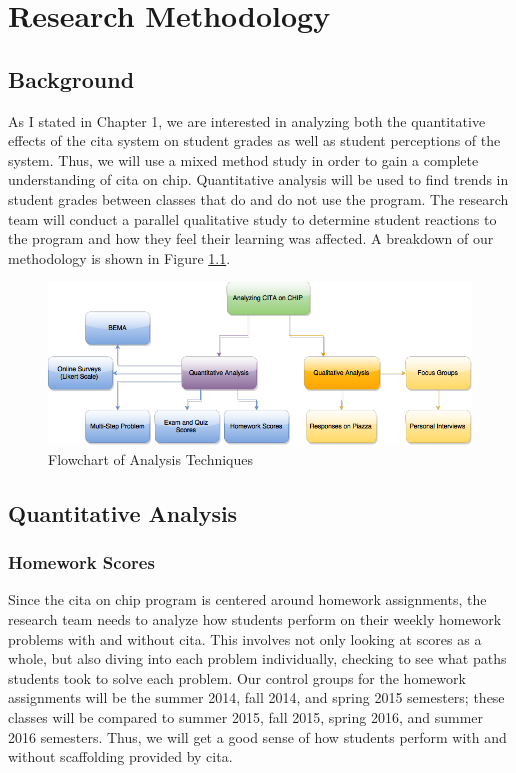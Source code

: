 \chapter[Research Methodology]{Research Methodology}

\section{Background}

As I stated in Chapter 1, we are interested in analyzing both the quantitative effects of the \gls{cita} system on student grades as well as student perceptions of the system. Thus, we will use a mixed method study in order to gain a complete understanding of \gls{cita} on \gls{chip}. Quantitative analysis will be used to find trends in student grades between classes that do and do not use the program. The research team will conduct a parallel qualitative study to determine student reactions to the program and how they feel their learning was affected. A breakdown of our methodology is shown in Figure \ref{fig:analysisFlowchart}.

\begin{figure}[h]
	\centering
	\includegraphics[width=6in]{img/chapter3/analysis_flowchart}
	\caption[Flowchart of Analysis Techniques]{Flowchart of Analysis Techniques}
  \label{fig:analysisFlowchart}
\end{figure}

\section{Quantitative Analysis}

\subsection{Homework Scores}

Since the \gls{cita} on \gls{chip} program is centered around homework assignments, the research team needs to analyze how students perform on their weekly homework problems with and without \gls{cita}. This involves not only looking at scores as a whole, but also diving into each problem individually, checking to see what paths students took to solve each problem. Our control groups for the homework assignments will be the summer 2014, fall 2014, and spring 2015 semesters; these classes will be compared to summer 2015, fall 2015, spring 2016, and summer 2016 semesters. Thus, we will get a good sense of how students perform with and without scaffolding provided by \gls{cita}.

